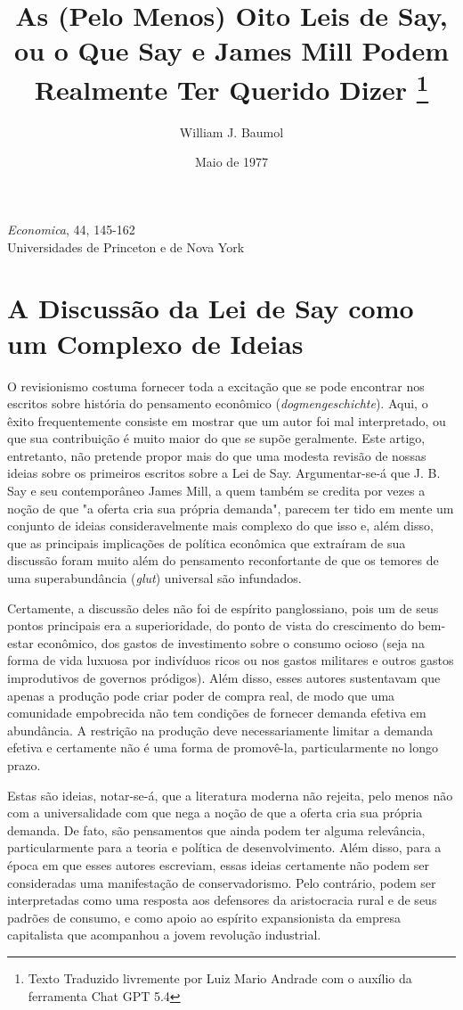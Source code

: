 \documentclass[12pt]{article}
\title{As (Pelo Menos) Oito Leis de Say, ou o Que Say e James Mill Podem Realmente Ter Querido Dizer \thanks{Texto Traduzido livremente por Luiz Mario Andrade com o auxílio da ferramenta Chat GPT 5.4}}
\author{William J. Baumol}
\date{Maio de 1977}
\begin{document}
\maketitle

\begin{center}
\textit{Economica}, 44, 145-162\\
Universidades de Princeton e de Nova York
\end{center}

\section{A Discussão da Lei de Say como um Complexo de Ideias}

O revisionismo costuma fornecer toda a excitação que se pode encontrar nos escritos sobre história do pensamento econômico (\textit{dogmengeschichte}). Aqui, o êxito frequentemente consiste em mostrar que um autor foi mal interpretado, ou que sua contribuição é muito maior do que se supõe geralmente. Este artigo, entretanto, não pretende propor mais do que uma modesta revisão de nossas ideias sobre os primeiros escritos sobre a Lei de Say. Argumentar-se-á que J. B. Say e seu contemporâneo James Mill, a quem também se credita por vezes a noção de que "a oferta cria sua própria demanda", parecem ter tido em mente um conjunto de ideias consideravelmente mais complexo do que isso e, além disso, que as principais implicações de política econômica que extraíram de sua discussão foram muito além do pensamento reconfortante de que os temores de uma superabundância (\textit{glut}) universal são infundados.

Certamente, a discussão deles não foi de espírito panglossiano, pois um de seus pontos principais era a superioridade, do ponto de vista do crescimento do bem-estar econômico, dos gastos de investimento sobre o consumo ocioso (seja na forma de vida luxuosa por indivíduos ricos ou nos gastos militares e outros gastos improdutivos de governos pródigos). Além disso, esses autores sustentavam que apenas a produção pode criar poder de compra real, de modo que uma comunidade empobrecida não tem condições de fornecer demanda efetiva em abundância. A restrição na produção deve necessariamente limitar a demanda efetiva e certamente não é uma forma de promovê-la, particularmente no longo prazo.

Estas são ideias, notar-se-á, que a literatura moderna não rejeita, pelo menos não com a universalidade com que nega a noção de que a oferta cria sua própria demanda. De fato, são pensamentos que ainda podem ter alguma relevância, particularmente para a teoria e política de desenvolvimento. Além disso, para a época em que esses autores escreviam, essas ideias certamente não podem ser consideradas uma manifestação de conservadorismo. Pelo contrário, podem ser interpretadas como uma resposta aos defensores da aristocracia rural e de seus padrões de consumo, e como apoio ao espírito expansionista da empresa capitalista que acompanhou a jovem revolução industrial.
\end{document}
